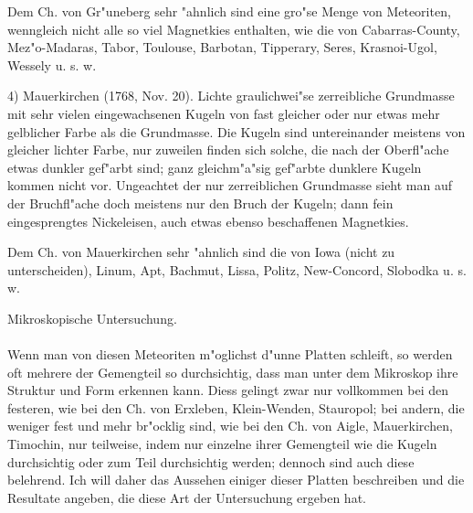 \documentclass[a4paper, 11pt, oneside, german]{article}
\begin{document}
Dem Ch. von Gr"uneberg sehr "ahnlich sind eine gro"se Menge von Meteoriten, wenngleich nicht alle so viel Magnetkies enthalten, wie die von Cabarras-County, Mez"o-Madaras, Tabor, Toulouse, Barbotan, Tipperary, Seres, Krasnoi-Ugol, Wessely u. s. w.

4) Mauerkirchen (1768, Nov. 20). Lichte graulichwei"se zerreibliche Grundmasse mit sehr vielen eingewachsenen Kugeln von fast gleicher oder nur etwas mehr gelblicher Farbe als die Grundmasse. Die Kugeln sind untereinander meistens von gleicher lichter Farbe, nur zuweilen finden sich solche, die nach der Oberfl"ache etwas dunkler gef"arbt sind; ganz gleichm"a"sig gef"arbte dunklere Kugeln kommen nicht vor. Ungeachtet der nur zerreiblichen Grundmasse sieht man auf der Bruchfl"ache doch meistens nur den Bruch der Kugeln; dann fein eingesprengtes Nickeleisen, auch etwas ebenso beschaffenen Magnetkies.

Dem Ch. von Mauerkirchen sehr "ahnlich sind die von Iowa (nicht zu unterscheiden), Linum, Apt, Bachmut, Lissa, Politz, New-Concord, Slobodka u. s. w.
\begin{center}
Mikroskopische Untersuchung.
\end{center}
\paragraph{}
Wenn man von diesen Meteoriten m"oglichst d"unne Platten schleift, so werden oft mehrere der Gemengteil so durchsichtig, dass man unter dem Mikroskop ihre Struktur und Form erkennen kann. Diess gelingt zwar nur vollkommen bei den festeren, wie bei den Ch. von Erxleben, Klein-Wenden, Stauropol; bei andern, die weniger fest und mehr br"ocklig sind, wie bei den Ch. von Aigle, Mauerkirchen, Timochin, nur teilweise, indem nur einzelne ihrer Gemengteil wie die Kugeln durchsichtig oder zum Teil durchsichtig werden; dennoch sind auch diese belehrend. Ich will daher das Aussehen einiger dieser Platten beschreiben und die Resultate angeben, die diese Art der Untersuchung ergeben hat.
\end{document}
